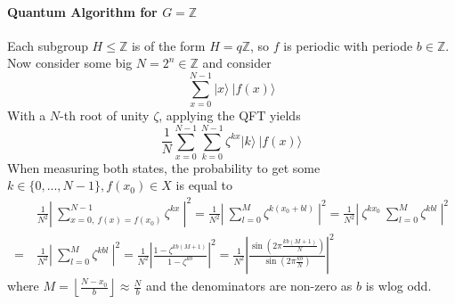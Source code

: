 \documentclass{scrartcl}
\newcommand{\Z}{\mathbb{Z}}
\begin{document}
\paragraph{Quantum Algorithm for $G = \Z$}
Each subgroup $H \leq \Z$ is of the form $H = q\Z$, so $f$ is periodic with periode $b \in \Z$.
Now consider some big $N = 2^n \in \Z$ and consider
\begin{equation*}
    \sum_{x = 0}^{N - 1} |x\rangle \ |f(x)\rangle
\end{equation*}
With a $N$-th root of unity $\zeta$, applying the QFT yields
\begin{equation*}
    \frac 1 N \sum_{x = 0}^{N - 1} \sum_{k = 0}^{N - 1} \zeta^{k x} |k\rangle \ |f(x)\rangle
\end{equation*}
When measuring both states, the probability to get some $k \in \{0, ..., N-1\}, f(x_0) \in X$ is equal to
\begin{align*}
    &\frac 1 {N^2} \left| \ \sum_{x = 0, \ f(x) = f(x_0)}^{N - 1} \zeta^{k x} \ \right|^2 = \frac 1 {N^2} \left| \ \sum_{l = 0}^M \zeta^{k (x_0 + bl)} \ \right|^2 = \frac 1 {N^2} \left| \ \zeta^{kx_0} \ \sum_{l = 0}^M \zeta^{kbl} \ \right|^2 \\
    = \ &\frac 1 {N^2} \left| \ \sum_{l = 0}^M \zeta^{kbl} \ \right|^2 = \frac 1 {N^2} \left| \frac {1 - \zeta^{kb(M + 1)}} {1 - \zeta^{kb}} \right|^2 = \frac 1 {N^2} \left| \frac {\sin(2\pi \frac {kb(M+1)} N)} {\sin(2\pi \frac {kb} N)} \right|^2
\end{align*}
where $M = \left\lfloor \frac {N - x_0} b \right\rfloor \approx \frac N b$ and the denominators are non-zero as $b$ is wlog odd.
\end{document}
